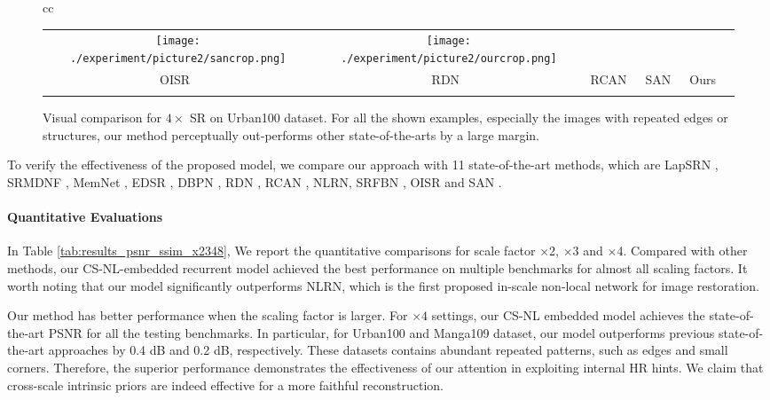 \documentclass[10pt,twocolumn,letterpaper]{article}
\newcommand{\widthscalefive}{0.145}
\begin{document}
\begin{figure*}[htbp]
\begin{tabular}{cc}
\begin{adjustbox}{valign=t}
\begin{tabular}{cccccc}
				\texttt{[image: ./experiment/picture2/sancrop.png]} \hspace{\fsdttwofigBD} &
				\texttt{[image: ./experiment/picture2/ourcrop.png]}  
				\\ 
				OISR~\cite{he2019ode} \hspace{\fsdttwofigBD} &
				RDN~\cite{zhang2018residual} \hspace{\fsdttwofigBD} &
				RCAN~\cite{zhang2018image} \hspace{\fsdttwofigBD} &
				SAN~\cite{dai2019second}  \hspace{\fsdttwofigBD} &
				Ours
				\\
				
				\\
			\end{tabular}
		\end{adjustbox}
	\end{tabular}
	\caption{
		Visual comparison for $4\times$ SR on Urban100 dataset. For all the shown examples, especially the images with repeated edges or structures, our method perceptually out-performs other state-of-the-arts by a large margin.
	}
	\label{tab:table 4}
\vspace{-3mm}
\end{figure*}
 To verify the effectiveness of the proposed model, we compare our approach with 11 state-of-the-art methods, which are LapSRN \cite{lai2017deep}, SRMDNF \cite{zhang2018learning}, MemNet \cite{tai2017memnet}, EDSR \cite{lim2017enhanced}, DBPN \cite{haris2018deep}, RDN \cite{zhang2018residual}, RCAN \cite{zhang2018image}, NLRN\cite{liu2018non}, SRFBN \cite{li2019feedback}, OISR \cite{he2019ode} and SAN \cite{dai2019second}. 

\paragraph{Quantitative Evaluations}
In Table \ref{tab:results_psnr_ssim_x2348}, We report the quantitative comparisons for scale factor $\times$2, $\times$3 and $\times$4. Compared with other methods, our CS-NL-embedded recurrent model achieved the best performance on multiple benchmarks for almost all scaling factors. It worth noting that our model significantly outperforms NLRN, which is the first proposed in-scale non-local network for image restoration. 

Our method has better performance when the scaling factor is larger. For $\times 4$ settings, our CS-NL embedded model achieves the state-of-the-art PSNR for all the testing benchmarks. In particular, for Urban100 and Manga109 dataset, our model outperforms previous state-of-the-art approaches by 0.4 dB and 0.2 dB, respectively. These datasets contains abundant repeated patterns, such as edges and small corners. Therefore, the superior performance demonstrates the effectiveness of our attention in exploiting internal HR hints. We claim that cross-scale intrinsic priors are indeed effective for a more faithful reconstruction.
\end{document}
